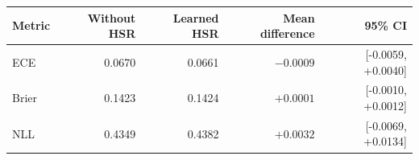\begin{tabular}{lrrrr}
\toprule
Metric & Without HSR & Learned HSR & Mean difference & 95\% CI \\
\midrule
ECE & 0.0670 & 0.0661 & $-0.0009$ & [-0.0059, +0.0040] \\
Brier & 0.1423 & 0.1424 & $+0.0001$ & [-0.0010, +0.0012] \\
NLL & 0.4349 & 0.4382 & $+0.0032$ & [-0.0069, +0.0134] \\
\bottomrule
\end{tabular}
